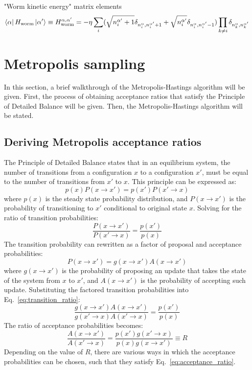 \documentclass[12pt, two sided]{article}
\begin{document}
"Worm kinetic energy" matrix elements
%
\begin{equation}
\bra{\alpha} H_{\mathrm{worm}} \ket{\alpha^\prime} \equiv H_{\mathrm{worm}}^{\alpha,\alpha^\prime} =  -\eta \sum_i  (\sqrt{n_i^{\alpha^\prime} + 1} \delta_{n_i^{\alpha},n_{i}^{\alpha^\prime}+1}  + \sqrt{n_i^{\alpha^\prime}} \delta_{n_i^{\alpha},n_{i}^{\alpha^\prime}-1}) \prod_{k\neq i} \delta_{n_k^{\alpha},n_k^{\alpha^\prime}} 
\end{equation}
%
\section{Metropolis sampling}

In this section, a brief walkthrough of the Metropolis-Hastings algorithm \cite{doi:10.1063/1.1699114} will be given. First, the process of obtaining acceptance ratios that satisfy the Principle of Detailed Balance will be given. Then, the Metropolis-Hastings algorithm will be stated.

\subsection{Deriving Metropolis acceptance ratios}

The Principle of Detailed Balance states that in an equilibrium system, the number of transitions from a configuration $x$ to a configuration $x'$, must be equal to the number of transitions from $x'$ to $x$. This principle can be expressed as:
%
\begin{equation}
\label{eq:detailed_balance_principle}
p(x)P(x \to x') = p(x') P(x' \to x)
\end{equation}
%
where $p(x)$ is the steady state probability distribution, and $P(x \to x')$ is the probability of transitioning to $x'$ conditional to original state $x$. Solving for the ratio of transition probabilities:
%
\begin{equation}
\label{eq:transition_ratio}
\frac{P(x \to x')}{P(x' \to x)} = \frac{p(x')}{p(x)} 
\end{equation}
%
The transition probability can rewritten as a factor of proposal and acceptance probabilities:
%
\begin{equation}
P(x \to x') = g(x \to x') A(x \to x')
\end{equation}
%
where $g(x \to x')$ is the probability of proposing an update that takes the state of the system from $x$ to $x'$, and $A(x \to x')$ is the probability of accepting such update. Substituting the factored transition probabilities into Eq.~\eqref{eq:transition_ratio}:
%
\begin{equation}
\frac{g(x \to x') A(x \to x')}{ g(x' \to x) A(x' \to x)} = \frac{p(x')}{p(x)} 
\end{equation}
%
The ratio of acceptance probabilities becomes:
%
\begin{equation}
\label{eq:acceptance_ratio}
\frac{A(x \to x')}{A(x' \to x)} = \frac{p(x')g(x' \to x)}{p(x) g(x \to x')} \equiv R
\end{equation}
%
Depending on the value of $R$, there are various ways in which the acceptance probabilities can be chosen, such that they satisfy Eq.~\eqref{eq:acceptance_ratio}.
\end{document}
